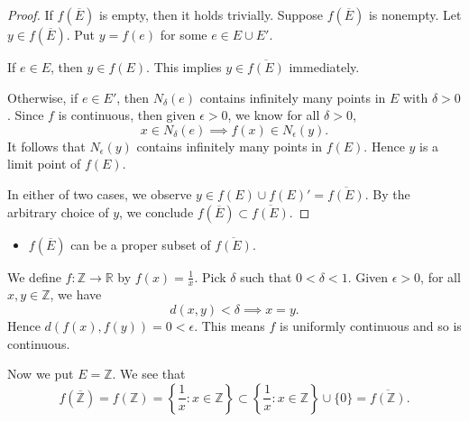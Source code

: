 \begin{Exercise}
	\begin{proof}
		If $f(\overline{E})$ is empty, then it holds trivially. Suppose $f(\overline{E})$ is nonempty. Let $y\in f(\overline{E})$. Put $y=f(e)$ for some $e\in E\cup E'$.
		
		If $e\in E$, then $y\in f(E)$. This implies $y\in\overline{f(E)}$ immediately.
		
		Otherwise, if $e\in E'$, then $N_{\delta}(e)$ contains infinitely many points in $E$ with $\delta>0$. Since $f$ is continuous, then given $\epsilon>0$, we know for all $\delta>0$,
		$$
		x\in N_{\delta}(e) \implies f(x)\in N_{\epsilon}(y).
		$$
		It follows that $N_{\epsilon}(y)$ contains infinitely many points in $f(E)$. Hence $y$ is a limit point of $f(E)$.
		
		In either of two cases, we observe $y\in f(E)\cup f(E)' = \overline{f(E)}$. By the arbitrary choice of $y$, we conclude $f(\overline{E})\subset \overline{f(E)}$.
	\end{proof}
	
	\begin{itemize}
		\item $f(\overline{E})$ can be a proper subset of $\overline{f(E)}$.
	\end{itemize}
	\begin{solution}
		We define $f:\mathbb{Z}\to\mathbb{R}$ by $f(x) = \frac{1}{x}$. Pick $\delta$ such that $0 < \delta < 1$. Given $\epsilon>0$, for all $x,y\in \mathbb{Z}$, we have
		$$
		d(x,y)< \delta \implies x = y.
		$$
		Hence $d(f(x),f(y)) = 0 < \epsilon$. This means $f$ is uniformly continuous and so is continuous.
		
		Now we put $E = \mathbb{Z}$. We see that
		$$
		f(\overline{\mathbb{Z}}) 
		= f(\mathbb{Z}) 
		= \left\{ \frac{1}{x} : x\in\mathbb{Z} \right\}
		\subset \left\{ \frac{1}{x} : x\in\mathbb{Z} \right\} \cup \{0\}
		= \overline{f(\mathbb{Z})}.
		$$
	\end{solution}
\end{Exercise}